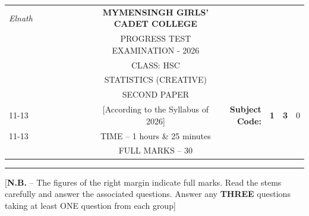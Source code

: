 \documentclass[12pt]{article}
\begin{document}
\begin{table}[]
\begin{tabular}{llllllllcllcl}
\textit{Elnath} &  &  &  &  &  &  &  & \textbf{MYMENSINGH GIRLS’ CADET COLLEGE} &                                             &                                 & \multicolumn{1}{l}{}            &                        \\
                 &  &  &  &  &  &  &  & PROGRESS TEST EXAMINATION - 2026          &                                             &                                 &                                 &                        \\
                 &  &  &  &  &  &  &  & CLASS: HSC                               &                                             &                                 &                                 &                        \\
                 &  &  &  &  &  &  &  & STATISTICS (CREATIVE)                    &                                             &                                 &                                 &                        \\
                 &  &  &  &  &  &  &  & SECOND PAPER                             &                                             &                                 & \multicolumn{1}{r}{}            &                        \\ \cline{11-13} 
                 &  &  &  &  &  &  &  & [According to the Syllabus of 2026]      & \multicolumn{1}{r|}{\textbf{Subject Code:}} & \multicolumn{1}{l|}{\textbf{1}} & \multicolumn{1}{l|}{\textbf{3}} & \multicolumn{1}{l|}{0} \\ \cline{11-13} 
                 &  &  &  &  &  &  &  & TIME – 1 hours \& 25 minutes             &                                             &                                 & \multicolumn{1}{r}{}            &                        \\
                 &  &  &  &  &  &  &  & FULL MARKS – 30                          &                                             &                                 & \multicolumn{1}{r}{\textbf{}}   &                       
\end{tabular}
\end{table}


\hrule

\begin{center}
[\textbf{N.B.} – The figures of the right margin indicate full marks. Read the stems carefully and answer the associated questions. Answer any \textbf{THREE} questions taking at least ONE question from each group]\\
\end{center}
\end{document}
